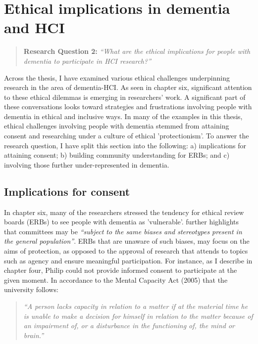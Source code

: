 \section{Ethical implications in dementia and HCI}
\label{Discussion:RQ2}
\begin{quote}
\textbf{    Research Question 2:
}    
\textit{    “What are the ethical implications for people with dementia to participate in HCI research?”}
\end{quote}

Across the thesis, I have examined various ethical challenges underpinning research in the area of dementia-HCI. As seen in chapter six, significant attention to these ethical dilemmas is emerging in researchers' work. A significant part of these conversations looks toward strategies and frustrations involving people with dementia in ethical and inclusive ways. In many of the examples in this thesis, ethical challenges involving people with dementia stemmed from attaining consent and researching under a culture of ethical 'protectionism'. To answer the research question, I have split this section into the following: a) implications for attaining consent; b)  building community understanding for ERBs; and c) involving those further under-represented in dementia.

\subsection{Implications for consent}
\label{Cosent-Implications}
In chapter six, many of the researchers stressed the tendency for ethical review boards (ERBs) to see people with dementia as 'vulnerable'. \cite{pachana_can_2014} further highlights that committees may be \textit{``subject to the same biases and stereotypes present in the general population''}. ERBs that are unaware of such biases, may focus on the aims of protection, as opposed to the approval of research that attends to topics such as agency and ensure meaningful participation. For instance, as I describe in chapter four, Philip could not provide informed consent to participate at the given moment. In accordance to the Mental Capacity Act (2005) that the university follows:

\begin{quote}
\textit{``A person lacks capacity in relation to a matter if at the material time he is unable to make a decision for himself in relation to the matter because of an impairment of, or a disturbance in the functioning of, the mind or brain.''} \citep{oyebode_mental_2005}
\end{quote}

